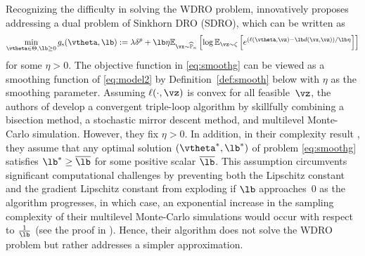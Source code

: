 	Recognizing the difficulty in solving the WDRO problem, \cite{wang2021sinkhorn} innovatively proposes addressing a dual problem of Sinkhorn DRO (SDRO),  
	which can be written as 
	\begin{equation}
		\label{eq:smoothg}
		\min_{\vtheta\in \Theta, \lb\ge 0}g_{\mathrm{s}}(\vtheta, \lb) :=  \lambda \delta^p+  \lb\eta \mathbb{E}_{\vx \sim \widehat{\mathbb{P}}_n}\left[\log \mathbb{E}_{\vz \sim \zeta}\left[e^{(\ell(\vtheta,\vz) -\lb d(\vx,\vz)) / \lb\eta}\right]\right]
	\end{equation}
	for some $\eta>0$.  
	The objective function in \eqref{eq:smoothg} can be viewed as a smoothing function of \eqref{eq:model2} by Definition~\ref{def:smooth} below with $\eta $ as the smoothing parameter. %
	Assuming $\ell(\cdot,\vz)$ is convex for all feasible~$\vz$, the authors of \cite{wang2021sinkhorn} develop a convergent triple-loop algorithm by skillfully combining a bisection method, a stochastic mirror descent method, and multilevel Monte-Carlo simulation.
	However, they fix $\eta>0$. In addition, in their complexity result \cite[Theorem 3]{wang2021sinkhorn}, they assume that any optimal solution $(\vtheta^*,\lb^*)$ of problem \eqref{eq:smoothg} satisfies $\lb^*\ge \overline{\lb}$ for some positive scalar $\overline{\lb}$.
	This assumption circumvents significant computational challenges by preventing both the Lipschitz constant and the gradient Lipschitz constant from exploding if %
	$\lb$ approaches~0 as the algorithm progresses, 
	in which case, an exponential increase in the sampling complexity of their multilevel Monte-Carlo simulations would occur with respect to $\frac{1}{\lb}$ (see the proof in \cite[Proposition EC.4]{wang2021sinkhorn}). 
	Hence, their algorithm does not solve the WDRO problem but rather addresses a simpler approximation.    
	
